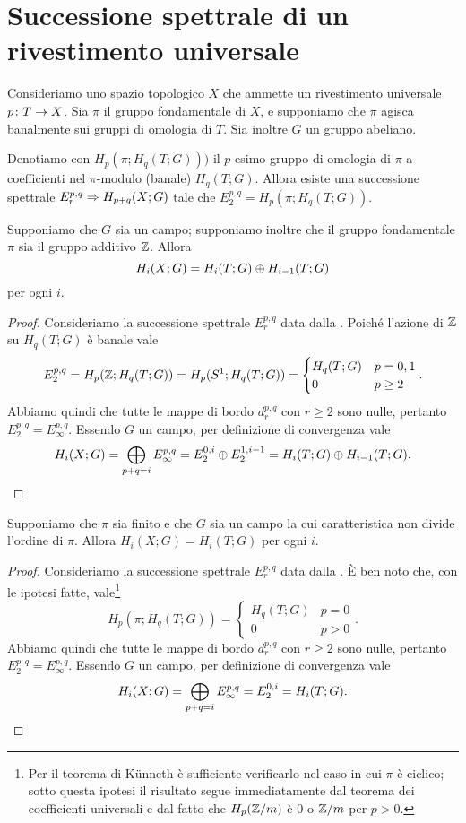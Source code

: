\section{Successione spettrale di un rivestimento universale}
Consideriamo uno spazio topologico $X$ che ammette un rivestimento universale $p\colon T\to X$. Sia $\pi$ il gruppo fondamentale di $X$, e supponiamo che $\pi$ agisca banalmente sui gruppi di omologia di $T$. Sia inoltre $G$ un gruppo abeliano.
\begin{proposition}
Denotiamo con $H_p(\pi;H_q(T;G)))$ il $p$-esimo gruppo di omologia di $\pi$ a coefficienti nel $\pi$-modulo (banale) $H_q(T;G)$. Allora esiste una successione spettrale $E^{p,q}_r\Rightarrow H_{p+q}(X;G)$ tale che $E^{p,q}_2=H_p(\pi;H_q(T;G))$.
\end{proposition}
\begin{corollary}
Supponiamo che $G$ sia un campo; supponiamo inoltre che il gruppo fondamentale $\pi$ sia il gruppo additivo $\mathbb{Z}$. Allora
$$
H_i(X;G)=H_i(T;G)\mathbin{\oplus} H_{i-1}(T;G)
$$
per ogni $i$.
\end{corollary}
\begin{proof}
Consideriamo la successione spettrale $E^{p,q}_r$ data dalla . Poiché l'azione di $\mathbb{Z}$ su $H_q(T;G)$ è banale vale
$$
E^{p,q}_2=H_p(\mathbb{Z};H_q(T;G))=H_p(S^1;H_q(T;G))=
\begin{cases}
H_q(T;G)&p=0,1\\
0&p\ge 2
\end{cases}.
$$
Abbiamo quindi che tutte le mappe di bordo $d^{p,q}_r$ con $r\ge 2$ sono nulle, pertanto $E^{p,q}_2=E^{p,q}_\infty$. Essendo $G$ un campo, per definizione di convergenza vale
$$
H_i(X;G)=\bigoplus_{p+q=i}E^{p,q}_\infty=E^{0,i}_2\mathbin{\oplus} E^{1,i-1}_2=H_i(T;G)\mathbin{\oplus} H_{i-1}(T;G).
$$
\end{proof}
\begin{corollary}
Supponiamo che $\pi$ sia finito e che $G$ sia un campo la cui caratteristica non divide l'ordine di $\pi$. Allora $H_i(X;G)=H_i(T;G)$ per ogni $i$.
\end{corollary}
\begin{proof}
Consideriamo la successione spettrale $E^{p,q}_r$ data dalla . È ben noto che, con le ipotesi fatte, vale\footnote{Per il teorema di Künneth è sufficiente verificarlo nel caso in cui $\pi$ è ciclico; sotto questa ipotesi il risultato segue immediatamente dal teorema dei coefficienti universali e dal fatto che $H_p(\mathbb{Z}/m)$ è $0$ o $\mathbb{Z}/m$ per $p>0$.}
$$
H_p(\pi;H_q(T;G))=
\begin{cases}
H_q(T;G)&p=0\\
0&p>0
\end{cases}.
$$
Abbiamo quindi che tutte le mappe di bordo $d^{p,q}_r$ con $r\ge 2$ sono nulle, pertanto $E^{p,q}_2=E^{p,q}_\infty$. Essendo $G$ un campo, per definizione di convergenza vale
$$
H_i(X;G)=\bigoplus_{p+q=i}E^{p,q}_\infty=E^{0,i}_2=H_i(T;G).
$$
\end{proof}

